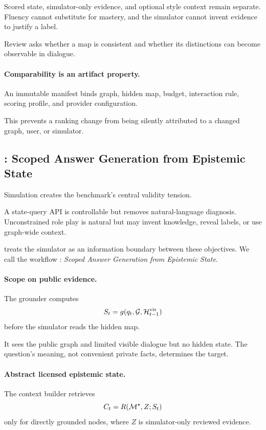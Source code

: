 Scored state, simulator-only evidence, and optional style context remain separate. Fluency cannot
substitute for mastery, and the simulator cannot invent evidence to justify a label.

Review asks whether a map is consistent and whether its distinctions can become observable in dialogue.

\paragraph{Comparability is an artifact property.}
An immutable manifest binds graph, hidden map, budget, interaction rule, scoring profile, and provider
configuration.

This prevents a ranking change from being silently attributed to a changed graph, user, or simulator.

\subsection{\sagesim: Scoped Answer Generation from Epistemic State}
\label{sec:simulator}

Simulation creates the benchmark's central validity tension.

A state-query API is controllable but removes natural-language diagnosis. Unconstrained role play is
natural but may invent knowledge, reveal labels, or use graph-wide context.

\knowact treats the simulator as an information boundary between these objectives. We call the
workflow \sagesim: \emph{Scoped Answer Generation from Epistemic State}.

\paragraph{Scope on public evidence.}
The grounder computes
\begin{equation}
S_t = g(q_t,\mathcal{G},\mathcal{H}^{\mathrm{vis}}_{t-1})
\end{equation}
before the simulator reads the hidden map.

It sees the public graph and limited visible dialogue but no hidden state. The question's meaning, not
convenient private facts, determines the target.

\paragraph{Abstract licensed epistemic state.}
The context builder retrieves
\begin{equation}
C_t = R(\mathcal{M}^{\star},Z;S_t)
\end{equation}
only for directly grounded nodes, where $Z$ is simulator-only reviewed evidence.

